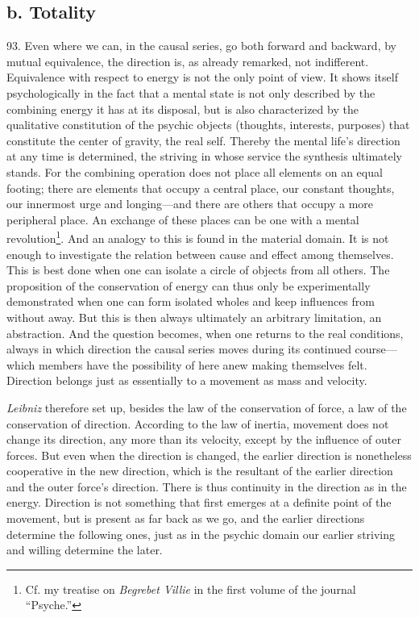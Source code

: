 \documentclass[12pt,a4paper]{book}
\newcommand{\opage}[1]{\marginnote{\footnotesize\textit{[#1]}}}
\begin{document}
\subsection*{b. Totality}

93. Even where we can, in the causal series, go both forward and backward, by
mutual equivalence, the direction is, as already remarked, not indifferent.
Equivalence with respect to energy is not the only point of view. It shows
itself psychologically in the fact that a mental state is not only described
by the combining energy it has at its disposal, but is also characterized by
the qualitative constitution of the psychic objects (thoughts, interests,
purposes) that constitute the center of gravity, the real self. Thereby the
mental life's direction at any time is determined, the striving in whose
service the synthesis ultimately stands. For the combining operation does not
place all elements on an equal footing; there are elements that occupy a
central place, our constant thoughts, our innermost urge and longing---and
there are others that occupy a more peripheral place. An exchange of these
places can be one with a mental revolution\footnote{Cf. my treatise on
\emph{Begrebet Villie} in the first volume of the journal ``Psyche.''}. And an
analogy to this is found in the material domain. It is not enough to
investigate the relation between cause and effect among themselves. This is
best done when one can isolate a circle of objects from all others. The
proposition of the conservation of energy can thus only be experimentally
demonstrated when one can form isolated wholes and keep influences from
without away. But this is then always ultimately an arbitrary limitation, an
abstraction. And the question becomes, when one returns to the real
conditions, always in which direction the causal series moves during its
continued course---which members have the possibility of here anew making
themselves felt. Direction belongs just \opage{219}as essentially to a movement as mass
and velocity.

\emph{Leibniz} therefore set up, besides the law of the conservation of
force, a law of the conservation of direction. According to the law of
inertia, movement does not change its direction, any more than its velocity,
except by the influence of outer forces. But even when the direction is
changed, the earlier direction is nonetheless cooperative in the new
direction, which is the resultant of the earlier direction and the outer
force's direction. There is thus continuity in the direction as in the
energy. Direction is not something that first emerges at a definite point of
the movement, but is present as far back as we go, and the earlier directions
determine the following ones, just as in the psychic domain our earlier
striving and willing determine the later.
\end{document}
